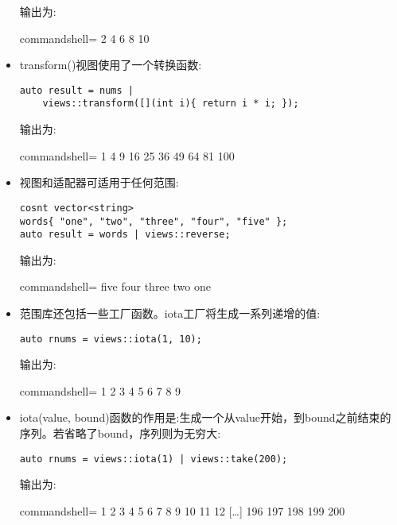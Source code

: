 \begin{itemize}
输出为:

\begin{tcblisting}{commandshell={}}
2 4 6 8 10
\end{tcblisting}

\item 
transform()视图使用了一个转换函数:

\begin{lstlisting}[style=styleCXX]
auto result = nums |
	views::transform([](int i){ return i * i; });
\end{lstlisting}

输出为:

\begin{tcblisting}{commandshell={}}
1 4 9 16 25 36 49 64 81 100
\end{tcblisting}

\item 
视图和适配器可适用于任何范围:

\begin{lstlisting}[style=styleCXX]
cosnt vector<string>
words{ "one", "two", "three", "four", "five" };
auto result = words | views::reverse;
\end{lstlisting}

输出为:

\begin{tcblisting}{commandshell={}}
five four three two one
\end{tcblisting}

\item 
范围库还包括一些工厂函数。iota工厂将生成一系列递增的值:

\begin{lstlisting}[style=styleCXX]
auto rnums = views::iota(1, 10);
\end{lstlisting}

输出为:

\begin{tcblisting}{commandshell={}}
1 2 3 4 5 6 7 8 9
\end{tcblisting}

\item 
iota(value, bound)函数的作用是:生成一个从value开始，到bound之前结束的序列。若省略了bound，序列则为无穷大:

\begin{lstlisting}[style=styleCXX]
auto rnums = views::iota(1) | views::take(200);
\end{lstlisting}

输出为:

\begin{tcblisting}{commandshell={}}
1 2 3 4 5 6 7 8 9 10 11 12 […] 196 197 198 199 200
\end{tcblisting}
\end{itemize}

